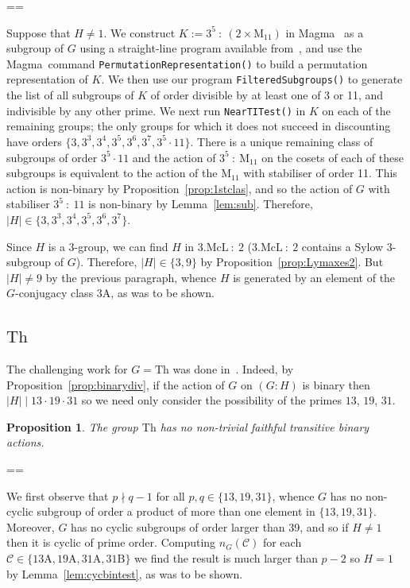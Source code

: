 \documentclass[11pt, a4paper]{amsart}
\makeatletter
\newcommand{\magma}{{\sc Magma}}
\def\cn{\mathord{{\!\:{:}\:\!}}}
\newtheorem{prop}[thm]{Proposition}
\renewcommand{\proofname}{Proof}
\renewenvironment{proof}[1][\proofname]{\par
  \pushQED{\qed}  \normalfont \partopsep=\z@skip \topsep=\z@skip
  \trivlist
  \item[\hskip\labelsep
        \scshape
    #1\@addpunct{.}]\ignorespaces
}{  \popQED\endtrivlist\@endpefalse
}
\makeatother
\begin{document}
\begin{proof}
Suppose that $H\ne 1$. We construct $K:=3^{5}\cn(2\times\mathrm{M}_{11})$ in \magma~\cite{magma} as a subgroup of $G$ using a straight-line program available from~\cite{webatlas}, and use the \magma~command {\tt{PermutationRepresentation()}} to build a permutation representation of $K$. We then use our program {\tt{FilteredSubgroups()}} to generate the list of all subgroups of $K$ of order divisible by at least one of 3 or 11, and indivisible by any other prime. We next run {\tt{NearTITest()}} in $K$ on each of the remaining groups; the only groups for which it does not succeed in discounting have orders $\{3,3^3,3^4,3^5,3^6,3^7,3^5\cdot11\}.$ There is a unique remaining class of subgroups of order $3^5\cdot 11$ and the action of $3^5\cn\mathrm{M}_{11}$ on the cosets of each of these subgroups is equivalent to the action of the $\mathrm{M}_{11}$ with stabiliser of order 11. This action is non-binary by Proposition~\ref{prop:1stclas}, and so the action of $G$ with stabiliser $3^5\cn 11$ is non-binary by Lemma~\ref{lem:sub}. Therefore, $|H|\in\{3,3^3,3^4,3^5,3^6,3^7\}$.

Since $H$ is a $3$-group, we can find $H$ in $3.\mathrm{McL}\cn 2$ ($3.\mathrm{McL}\cn2$ contains a Sylow 3-subgroup of $G$). Therefore, $|H|\in\{3,9\}$ by Proposition~\ref{prop:Lymaxes2}. But $|H|\ne 9$ by the previous paragraph, whence $H$ is generated by an element of the $G$-conjugacy class $\mathrm{3A}$, as was to be shown.
\end{proof}
\subsection{$\mathrm{Th}$} The challenging work for $G=\mathrm{Th}$ was done in~\cite{CDP}. Indeed, by Proposition~\ref{prop:binarydiv}, if the action of $G$ on $(G:H)$ is binary then $|H| \mid 13\cdot19\cdot31$ so we need only consider the possibility of the primes $13$, $19$, $31$.
\begin{prop}
   The group $\mathrm{Th}$ has no non-trivial faithful transitive binary actions.
\end{prop}

\begin{proof}
    We first observe that $p\nmid q-1$ for all $p,q\in\{13,19,31\}$, whence $G$ has no non-cyclic subgroup of order a product of more than one element in $\{13,19,31\}$. Moreover, $G$ has no cyclic subgroups of order larger than 39, and so if $H\ne 1$ then it is cyclic of prime order. Computing $n_G(\mathcal{C})$ for each $\mathcal{C}\in\{\mathrm{13A,19A,31A,31B}\}$ we find the result is much larger than $p-2$ so $H=1$ by Lemma~\ref{lem:cycbintest}, as was to be shown.
\end{proof}
\end{document}

